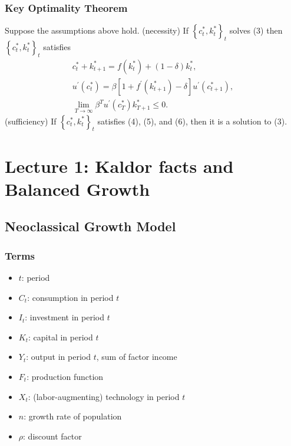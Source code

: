 \documentclass[10pt]{article}
\begin{document}
\subsubsection{Key Optimality Theorem}

\begin{theorem}
    
    Suppose the assumptions above hold.
(necessity) If $\left\{c_t^*, k_t^*\right\}_t$ solves (3) then $\left\{c_t^*, k_t^*\right\}_t$ satisfies
$$
\begin{gathered}
c_t^*+k_{t+1}^*=f\left(k_t^*\right)+(1-\delta) k_t^*, \\
u^{\prime}\left(c_t^*\right)=\beta\left[1+f^{\prime}\left(k_{t+1}^*\right)-\delta\right] u^{\prime}\left(c_{t+1}^*\right), \\
\lim _{T \rightarrow \infty} \beta^T u^{\prime}\left(c_T^*\right) k_{T+1}^* \leq 0 .
\end{gathered}
$$
(sufficiency) If $\left\{c_t^*, k_t^*\right\}_t$ satisfies (4), (5), and (6), then it is a solution to (3).

\end{theorem}

\section{Lecture 1: Kaldor facts and Balanced Growth}

\subsection{Neoclassical Growth Model}

\subsubsection{Terms}

\begin{itemize}
    \item $t$: period
    \item $C_t$: consumption in period $t$
    \item $I_t$: investment in period $t$
    \item $K_t$: capital in period $t$
    \item $Y_t$: output in period $t$, sum of factor income
    \item $F_t$: production function
    \item $X_t$: (labor-augmenting) technology in period $t$
    \item $n$: growth rate of population
    \item $\rho$: discount factor
\end{itemize}
\end{document}

